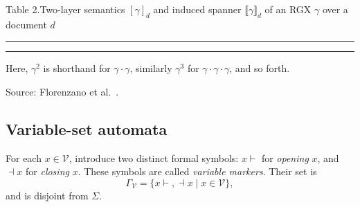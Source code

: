\vspace{1\baselineskip}
\noindent
\begin{minipage}{\linewidth}
\normalfont
\begin{center}
Table 2.\quad Two-layer semantics $[\gamma]_d$ and induced spanner
$\llbracket\gamma\rrbracket_d$ of an RGX $\gamma$ over a document $d$
\end{center}
\vspace{-0.5\baselineskip}
\hrule
\smallskip
\noindent{$\displaystyle
\begin{aligned}
  \llbracket\gamma\rrbracket_d
    &= \{\mu\mid ([1,|d|+1\rangle,\mu)\in[\gamma]_d\} \\
  [\varepsilon]_d
    &= \{(s,\varnothing)\mid s\in\mathrm{span}(d)\text{ and }d(s)=\varepsilon\} \\
  [a]_d
    &= \{(s,\varnothing)\mid s\in\mathrm{span}(d)\text{ and }d(s)=a\} \\
  [x\{\gamma\}]_d
    &= \{(s,\mu)\mid\exists(s,\mu')\in[\gamma]_d:
        x\notin\mathrm{dom}(\mu')\text{ and }\mu=[x\to s]\cup\mu'\} \\
  [\gamma_1\cdot\gamma_2]_d
    &= \{(s,\mu)\mid\exists(s_1,\mu_1)\in[\gamma_1]_d,
        \exists(s_2,\mu_2)\in[\gamma_2]_d: \\
    &\qquad s=s_1\cdot s_2,\ \mathrm{dom}(\mu_1)\cap\mathrm{dom}(\mu_2)
        =\varnothing,\text{ and }\mu=\mu_1\cup\mu_2\} \\
  [\gamma_1 + \gamma_2]_d
    &= [\gamma_1]_d\cup[\gamma_2]_d \\
  [\gamma^*]_d
    &= [\varepsilon]_d\cup[\gamma]_d\cup[\gamma^2]_d
       \cup[\gamma^3]_d\cup\cdots
\end{aligned}
$}
\smallskip
\hrule
\smallskip
\noindent Here, $\gamma^2$ is shorthand for $\gamma\cdot\gamma$, similarly
$\gamma^3$ for $\gamma\cdot\gamma\cdot\gamma$, and so forth.
\end{minipage}
\par\smallskip
\noindent Source: Florenzano et al.~\cite[Table~2]{FlorenzanoRUVV20}.
\par\smallskip

\newpage

\subsection{Variable-set automata}\label{subsec:va}

For each $x\in\mathcal V$, introduce two distinct formal symbols:
$x\vdash$ for \emph{opening} $x$, and $\dashv x$ for \emph{closing} $x$.
These symbols are called \emph{variable markers}. Their set is
\[
  \Gamma_{\mathcal V}
  =\{x\vdash,\dashv x\mid x\in\mathcal V\},
\]
and is disjoint from $\Sigma$.

